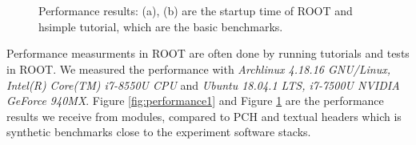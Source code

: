 \documentclass{webofc}
\begin{document}
\begin{figure}
\centering
    \begin{minipage}{.48\textwidth}
 　 \end{minipage}\hfill
    \begin{minipage}{.48\textwidth}
 　 \end{minipage}
\caption{Performance results: (a), (b) are the startup time of ROOT and hsimple tutorial, which are the basic benchmarks.}
\label{fig:performance2}
\end{figure}

Performance measurments in ROOT are often done by running tutorials and tests in ROOT.
We measured the performance with {\it Archlinux 4.18.16 GNU/Linux, Intel(R) Core(TM) i7-8550U CPU} and {\it Ubuntu 18.04.1 LTS, i7-7500U NVIDIA GeForce 940MX}.
Figure \ref{fig:performance1} and Figure \ref{fig:performance2} are the performance results we receive from modules, compared to PCH and textual headers which is synthetic benchmarks close to the experiment software stacks.
\end{document}
